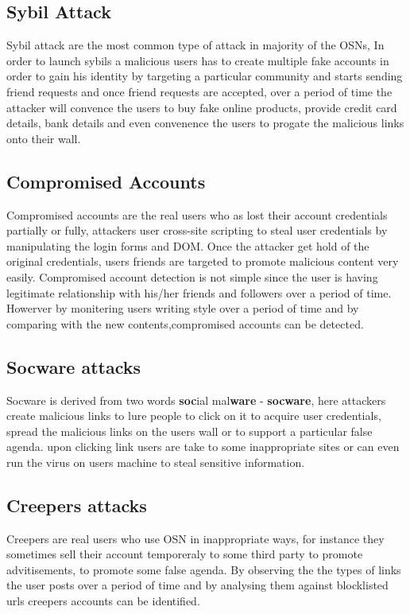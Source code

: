 \documentclass[conference]{IEEEtran}
\begin{document}
\subsection{Sybil Attack}
Sybil attack are the most common type of attack in majority of the OSNs, In order to launch sybils a malicious users has to create multiple fake accounts in order to gain his identity by targeting a particular community and starts sending friend requests and once friend requests are accepted, over a period of time the attacker will convence the users to buy fake online products, provide credit card details, bank details and even convenence the users to progate the malicious links onto their wall.

\subsection{Compromised Accounts}
Compromised accounts are the real users who as lost their account credentials partially or fully, attackers user cross-site scripting to steal user credentials by manipulating the login forms and DOM. Once the attacker get hold of the original credentials, users friends are targeted to promote malicious content very easily. Compromised account detection is not simple since the user is having legitimate relationship with his/her friends and followers over a period of time. Howerver by monitering users writing style over a period of time and by comparing with the new contents,compromised accounts can be detected.

\subsection{Socware attacks}
Socware is derived from two words \textbf{soc}ial mal\textbf{ware} - \textbf{socware}, here attackers create malicious links to lure people to click on it to acquire user credentials, spread the malicious links on the users wall or to support a particular false agenda. upon clicking link users are take to some inappropriate sites or can even run the virus on users machine to steal sensitive information.

\subsection{Creepers attacks}
Creepers are real users who use OSN in inappropriate ways, for instance they sometimes sell their account temporeraly to some third party to promote advitisements, to promote some false agenda. By observing the the types of links the user posts over a period of time and by analysing them against blocklisted urls creepers accounts can be identified.
\end{document}
